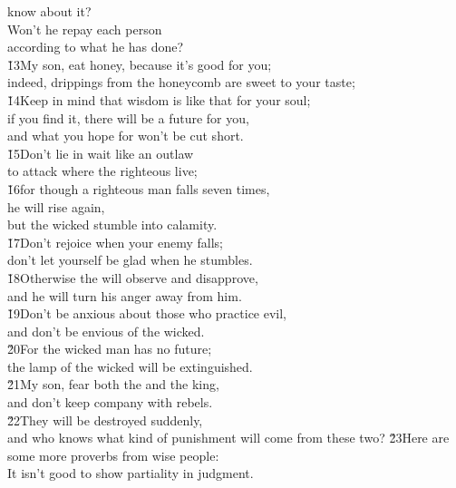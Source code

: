 \begin{poetry}
\poemll    know about it? \\
\poeml Won't he repay each person \\
\poemll    according to what he has done? \\
\poeml \v{13}My son, eat honey, because it's good for you; \\
\poemll    indeed, drippings from the honeycomb are sweet to your taste; \\
\poeml \v{14}Keep in mind that wisdom is like that for your soul; \\
\poemll    if you find it, there will be a future for you, \\
\poemlll       and what you hope for won't be cut short. \\
\poeml \v{15}Don't lie in wait like an outlaw \\
\poemll    to attack where the righteous live; \\
\poeml \v{16}for though a righteous man falls seven times, \\
\poemll    he will rise again, \\
\poemlll       but the wicked stumble into calamity. \\
\poeml \v{17}Don't rejoice when your enemy falls; \\
\poemll    don't let yourself be glad when he stumbles. \\
\poeml \v{18}Otherwise the  will observe and disapprove, \\
\poemll    and he will turn his anger away from him. \\
\poeml \v{19}Don't be anxious about those who practice evil, \\
\poemll    and don't be envious of the wicked. \\
\poeml \v{20}For the wicked man has no future; \\
\poemll    the lamp of the wicked will be extinguished. \\
\poeml \v{21}My son, fear both the  and the king, \\
\poemll    and don't keep company with rebels. \\
\poeml \v{22}They will be destroyed suddenly, \\
\poemll    and who knows what kind of punishment will come from these two?
\poeml \v{23}Here are some more proverbs from wise people: \\
\poeml It isn't good to show partiality in judgment. \\

\end{poetry}

